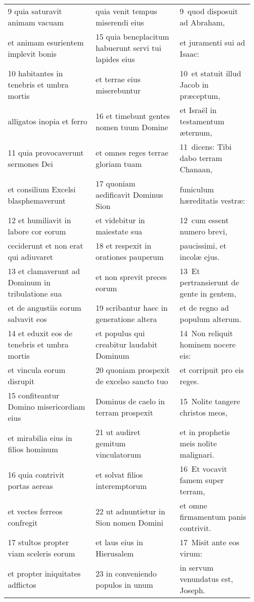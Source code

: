 \documentclass{article}
\begin{document}
\begin{longtable}{@{}p{}p{}p{}@{}}
9 quia saturavit animam vacuam	&	quia venit tempus miserendi eius	&	9 quod disposuit ad Abraham,	\\
et animam esurientem implevit bonis	&	15 quia beneplacitum habuerunt servi tui lapides eius	&	et juramenti sui ad Isaac:	\\
10 habitantes in tenebris et umbra mortis	&	et terrae eius miserebuntur	&	10 et statuit illud Jacob in præceptum,	\\
alligatos inopia et ferro	&	16 et timebunt gentes nomen tuum Domine	&	et Israël in testamentum æternum,	\\
11 quia provocaverunt sermones Dei	&	et omnes reges terrae gloriam tuam	&	11 dicens: Tibi dabo terram Chanaan,	\\
et consilium Excelsi blasphemaverunt	&	17 quoniam aedificavit Dominus Sion	&	funiculum hæreditatis vestræ:	\\
12 et humiliavit in labore cor eorum	&	et videbitur in maiestate sua	&	12 cum essent numero brevi,	\\
ceciderunt et non erat qui adiuvaret	&	18 et respexit in orationes pauperum	&	paucissimi, et incolæ ejus.	\\
13 et clamaverunt ad Dominum in tribulatione sua	&	et non sprevit preces eorum	&	13 Et pertransierunt de gente in gentem,	\\
et de angustiis eorum salvavit eos	&	19 scribantur haec in generatione altera	&	et de regno ad populum alterum.	\\
14 et eduxit eos de tenebris et umbra mortis	&	et populus qui creabitur laudabit Dominum	&	14 Non reliquit hominem nocere eis:	\\
et vincula eorum disrupit	&	20 quoniam prospexit de excelso sancto tuo	&	et corripuit pro eis reges.	\\
15 confiteantur Domino misericordiam eius	&	Dominus de caelo in terram prospexit	&	15 Nolite tangere christos meos,	\\
et mirabilia eius in filios hominum	&	21 ut audiret gemitum vinculatorum	&	et in prophetis meis nolite malignari.	\\
16 quia contrivit portas aereas	&	et solvat filios interemptorum	&	16 Et vocavit famem super terram,	\\
et vectes ferreos confregit	&	22 ut adnuntietur in Sion nomen Domini	&	et omne firmamentum panis contrivit.	\\
17 stultos propter viam sceleris eorum	&	et laus eius in Hierusalem	&	17 Misit ante eos virum:	\\
et propter iniquitates adflictos	&	23 in conveniendo populos in unum	&	in servum venundatus est, Joseph.	\\

\end{longtable}
\end{document}
